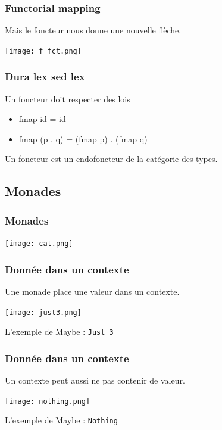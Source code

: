 \documentclass{beamer}
\begin{document}
\begin{frame}
\frametitle{Functorial mapping}
Mais le foncteur nous donne une nouvelle flèche.
\begin{center}
\texttt{[image: f\_fct.png]}
\end{center}
\end{frame}



\begin{frame}
\frametitle{Dura lex sed lex}
\begin{alertblock}{Un foncteur doit respecter des lois}
\begin{itemize}
\item fmap id = id
\item fmap (p . q) = (fmap p) . (fmap q)

\end{itemize}
\end{alertblock}

\pause
Un foncteur est un endofoncteur de la catégorie des types.
\end{frame}

\subsection{Monades}

\begin{frame}

\frametitle{Monades}
\begin{center}
\texttt{[image: cat.png]}
\end{center}
\end{frame}

\begin{frame}
\frametitle{Donnée dans un contexte}

\begin{block}{}
Une monade place une valeur dans un contexte.
\end{block}

\begin{center}
\texttt{[image: just3.png]}
\end{center}

\begin{exampleblock}{}
L'exemple de Maybe : \verb!Just 3!
\end{exampleblock}
\end{frame}

\begin{frame}
\frametitle{Donnée dans un contexte}

\begin{block}{}
Un contexte peut aussi ne pas contenir de valeur.
\end{block}

\begin{center}
\texttt{[image: nothing.png]}
\end{center}
\begin{exampleblock}{}
L'exemple de Maybe : \verb!Nothing!
\end{exampleblock}
\end{frame}
\end{document}
